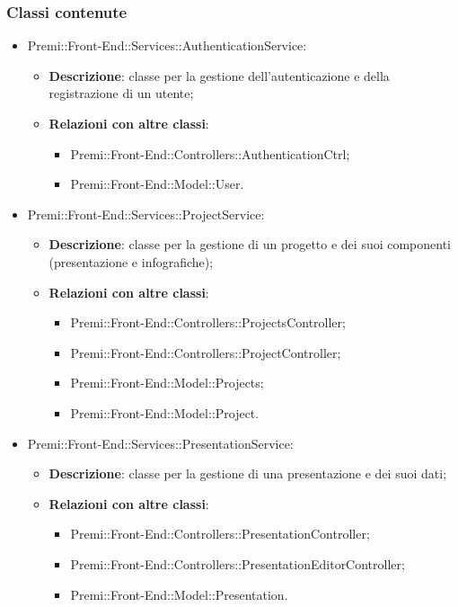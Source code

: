 \subsubsection*{Classi contenute}
\begin{itemize}

    \item Premi::Front-End::Services::AuthenticationService:
	\begin{itemize}
		\item \textbf{Descrizione}: classe per la gestione dell'autenticazione e della registrazione di un utente;
		\item \textbf{Relazioni con altre classi}:
		\begin{itemize}
			\item Premi::Front-End::Controllers::AuthenticationCtrl;
			\item Premi::Front-End::Model::User.
		\end{itemize}
	\end{itemize}

    \item Premi::Front-End::Services::ProjectService:
	\begin{itemize}
		\item \textbf{Descrizione}: classe per la gestione di un progetto e dei suoi componenti (presentazione e infografiche);
		\item \textbf{Relazioni con altre classi}:
		\begin{itemize}
			\item Premi::Front-End::Controllers::ProjectsController;
			\item Premi::Front-End::Controllers::ProjectController;
			\item Premi::Front-End::Model::Projects;
			\item Premi::Front-End::Model::Project.
		\end{itemize}
	\end{itemize}

    \item Premi::Front-End::Services::PresentationService:
	\begin{itemize}
		\item \textbf{Descrizione}: classe per la gestione di una presentazione e dei suoi dati;
		\item \textbf{Relazioni con altre classi}:
		\begin{itemize}
			\item Premi::Front-End::Controllers::PresentationController;
			\item Premi::Front-End::Controllers::PresentationEditorController;
			\item Premi::Front-End::Model::Presentation.
		\end{itemize}
	\end{itemize}


\end{itemize}
